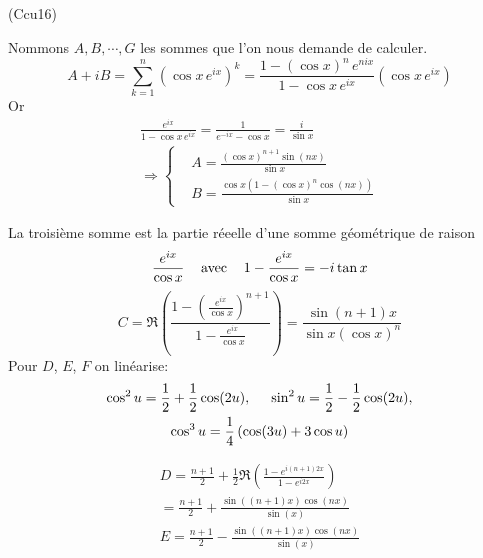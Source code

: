 \begin{tiny}(Ccu16)\end{tiny} Nommons $A, B, \cdots, G$ les sommes que l'on nous demande de calculer.
\begin{displaymath}
  A + iB = \sum_{k=1}^{n}(\cos x\, e^{ix})^k = \frac{1-(\cos x)^{n}\,e^{nix}}{1-\cos x\,e^{ix}} (\cos x\, e^{ix})
\end{displaymath}
Or
\begin{multline*}
\frac{e^{ix}}{1-\cos x\,e^{ix}} = \frac{1}{e^{-ix}-\cos x} = \frac{i}{\sin x}\\
\Rightarrow
\left\lbrace 
\begin{aligned}
 &A = \frac{(\cos x)^{n+1}\sin(nx)}{\sin x}\\
 &B = \frac{\cos x(1 - (\cos x)^n \cos(nx))}{\sin x}
\end{aligned}
\right. 
\end{multline*}

La troisième somme est la partie réeelle d'une somme géométrique de raison 
\begin{displaymath}
\frac{e^{ix}}{\cos x} \hspace{0.3cm}\text{ avec } \hspace{0.3cm} 1- \frac{e^{ix}}{\cos x} = -i\tan x  
\end{displaymath}
\begin{displaymath}
  C = \Re\left( \frac{1-\left( \frac{e^{ix}}{\cos x}\right)^{n+1} }{1-\frac{e^{ix}}{\cos x}}\right) 
  = \frac{\sin(n+1)x}{\sin x (\cos x)^n}
\end{displaymath}
Pour $D$, $E$, $F$ on linéarise:
\begin{multline*}
  \cos^2 u = \frac{1}{2} + \frac{1}{2}\cos(2u), \hspace{0.5cm}
  \sin^2 u = \frac{1}{2} - \frac{1}{2}\cos(2u),\\
  \cos^3 u = \frac{1}{4}\left( \cos(3u) + 3\cos u\right) 
\end{multline*}

\begin{multline*}
  D = \frac{n+1}{2} +\frac{1}{2}\Re\left(\frac{1-e^{i(n+1)2x}}{1-e^{i2x}} \right) \\
  = \frac{n+1}{2} +\frac{\sin((n+1)x)\cos(nx)}{\sin(x)}\\
  E = \frac{n+1}{2} -\frac{\sin((n+1)x)\cos(nx)}{\sin(x)}
\end{multline*}

